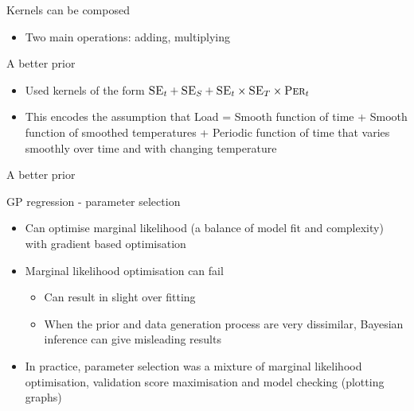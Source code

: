 \begin{frame}{Kernels can be composed}
  \begin{itemize} 
	\item Two main operations: adding, multiplying
  \end{itemize}
  
\end{frame}

\begin{frame}{A better prior}
  \begin{itemize}
    \item Used kernels of the form $\textsc{SE}_t + \textsc{SE}_S + \textsc{SE}_t \times \textsc{SE}_T \times \textsc{Per}_t$
    \item This encodes the assumption that Load = Smooth function of time + Smooth function of smoothed temperatures + Periodic function of time that varies smoothly over time and with changing temperature
  \end{itemize}
  \begin{centering}
    
  \end{centering}
\end{frame}

\begin{frame}{A better prior}
  \begin{centering}
    
  \end{centering}
\end{frame}

\begin{frame}{GP regression - parameter selection}
  \begin{itemize}
    \item Can optimise marginal likelihood (a balance of model fit and complexity) with gradient based optimisation
    \vspace{\baselineskip}
    \item Marginal likelihood optimisation can fail
    \begin{itemize}
      \item Can result in slight over fitting
      \item When the prior and data generation process are very dissimilar, Bayesian inference can give misleading results
    \end{itemize}
    \vspace{\baselineskip}
    \item In practice, parameter selection was a mixture of marginal likelihood optimisation, validation score maximisation and model checking (plotting graphs)
  \end{itemize}
\end{frame}

